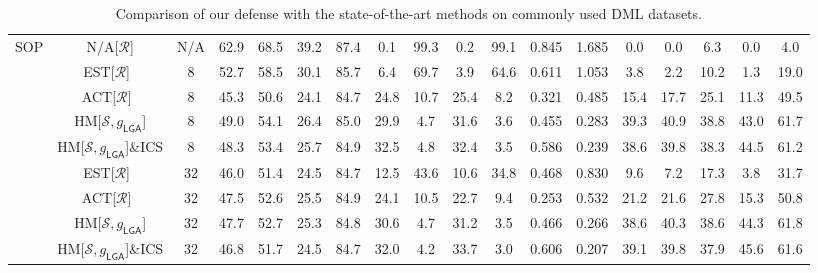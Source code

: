 \begin{table*}
{\begin{tabular}{c|cc|cccc|ccccc|ccccc|c}
\multirow{9}{*}{SOP} & N/A{[}$\mathcal{R}${]} & N/A & 62.9 & 68.5 & 39.2 & 87.4 & 0.1 & 99.3 & 0.2 & 99.1 & 0.845 & 1.685 & 0.0 & 0.0 & 6.3 & 0.0 & 4.0\tabularnewline
\cline{2-18} \cline{3-18} \cline{4-18} \cline{5-18} \cline{6-18} \cline{7-18} \cline{8-18} \cline{9-18} \cline{10-18} \cline{11-18} \cline{12-18} \cline{13-18} \cline{14-18} \cline{15-18} \cline{16-18} \cline{17-18} \cline{18-18} 
 & EST{[}$\mathcal{R}${]}~\cite{advrank} & 8 & 52.7 & 58.5 & 30.1 & 85.7 & 6.4 & 69.7 & 3.9 & 64.6 & 0.611 & 1.053 & 3.8 & 2.2 & 10.2 & 1.3 & 19.0\tabularnewline
 & ACT{[}$\mathcal{R}${]}~\cite{robrank} & 8 & 45.3 & 50.6 & 24.1 & 84.7 & 24.8 & 10.7 & 25.4 & 8.2 & 0.321 & 0.485 & 15.4 & 17.7 & 25.1 & 11.3 & 49.5\tabularnewline
 & HM{[}$\mathcal{S},g_{\mathsf{LGA}}${]} & 8 & 49.0 & 54.1 & 26.4 & 85.0 & 29.9 & 4.7 & 31.6 & 3.6 & 0.455 & 0.283 & 39.3 & 40.9 & 38.8 & 43.0 & 61.7\tabularnewline
 & HM{[}$\mathcal{S},g_{\mathsf{LGA}}${]}\&ICS & 8 & 48.3 & 53.4 & 25.7 & 84.9 & 32.5 & 4.8 & 32.4 & 3.5 & 0.586 & 0.239 & 38.6 & 39.8 & 38.3 & 44.5 & 61.2\tabularnewline
\cline{2-18} \cline{3-18} \cline{4-18} \cline{5-18} \cline{6-18} \cline{7-18} \cline{8-18} \cline{9-18} \cline{10-18} \cline{11-18} \cline{12-18} \cline{13-18} \cline{14-18} \cline{15-18} \cline{16-18} \cline{17-18} \cline{18-18} 
 & EST{[}$\mathcal{R}${]}~\cite{advrank} & 32 & 46.0 & 51.4 & 24.5 & 84.7 & 12.5 & 43.6 & 10.6 & 34.8 & 0.468 & 0.830 & 9.6 & 7.2 & 17.3 & 3.8 & 31.7\tabularnewline
 & ACT{[}$\mathcal{R}${]}~\cite{robrank} & 32 & 47.5 & 52.6 & 25.5 & 84.9 & 24.1 & 10.5 & 22.7 & 9.4 & 0.253 & 0.532 & 21.2 & 21.6 & 27.8 & 15.3 & 50.8\tabularnewline
 & HM{[}$\mathcal{S},g_{\mathsf{LGA}}${]} & 32 & 47.7 & 52.7 & 25.3 & 84.8 & 30.6 & 4.7 & 31.2 & 3.5 & 0.466 & 0.266 & 38.6 & 40.3 & 38.6 & 44.3 & 61.8\tabularnewline
 & HM{[}$\mathcal{S},g_{\mathsf{LGA}}${]}\&ICS & 32 & 46.8 & 51.7 & 24.5 & 84.7 & 32.0 & 4.2 & 33.7 & 3.0 & 0.606 & 0.207 & 39.1 & 39.8 & 37.9 & 45.6 & 61.6\tabularnewline

	\bottomrule

\end{tabular}}
	\vspace{-0.8em}
\caption{Comparison of our defense with the state-of-the-art methods on commonly used DML datasets.}
	\label{tab:sota}
	\vspace{-0.4em}
\end{table*}
